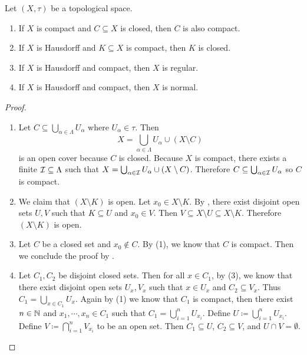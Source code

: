 \documentclass{techreport}
\begin{document}
\begin{proposition}\label{Prop:SeveralPropertiesOfCompactness}
	Let $(X,\tau)$ be a topological space.
	\begin{enumerate}
		\item If $X$ is compact and $C \subseteq X$ is closed, then $C$ is also compact.
		\item If $X$ is Hausdorff and $K \subseteq X$ is compact, then $K$ is closed.
		\item If $X$ is Hausdorff and compact, then $X$ is regular.
		\item If $X$ is Hausdorff and compact, then $X$ is normal.
	\end{enumerate}
\end{proposition}
\begin{proof}\
	\begin{enumerate}
		\item Let $C \subseteq \bigcup_{\alpha \in \Lambda} U_\alpha$ where $U_\alpha \in \tau$. Then
		\[
		X = \bigcup_{\alpha \in \Lambda} U_\alpha \cup (X \setminus C)
		\]
		is an open cover because $C$ is closed.
		Because $X$ is compact, there exists a finite $\mathcal{I} \subseteq \Lambda$ such that $X = \bigcup_{\alpha \in \mathcal{I}} U_\alpha \cup (X \setminus C)$.
		Therefore $C \subseteq \bigcup_{\alpha \in \mathcal{I}} U_\alpha$ so $C$ is compact.
		
		\item We claim that $(X \setminus K)$ is open.
		Let $x_0 \in X \setminus K$.
		By , there exist disjoint open sets $U,V$ such that $K \subseteq U$ and $x_0 \in V$.
		Then $V \subseteq X \setminus U \subseteq X \setminus K$.
		Therefore $(X \setminus K)$ is open.
		
		\item Let $C$ be a closed set and $x_0 \not\in C$.
		By (1), we know that $C$ is compact.
		Then we conclude the proof by .
		
		\item Let $C_1,C_2$ be disjoint closed sets.
		Then for all $x \in C_1$, by (3), we know that there exist disjoint open sets $U_x,V_x$ such that $x \in U_x$ and $C_2 \subseteq V_x$.
		Thus $C_1 = \bigcup_{x \in C_1} U_x$.
		Again by (1) we know that $C_1$ is compact, then there exist $n \in \mathbb{N}$ and $x_1,\cdots,x_n \in C_1$ such that $C_1 = \bigcup_{i=1}^n U_{x_i}$.
		Define $U \coloneqq \bigcup_{i=1}^n U_{x_i}$.
		Define $V \coloneqq \bigcap_{i=1}^n V_{x_i}$ to be an open set.
		Then $C_1 \subseteq U$, $C_2 \subseteq V$, and $U \cap V =\emptyset$.
	\end{enumerate}
\end{proof}
\end{document}

